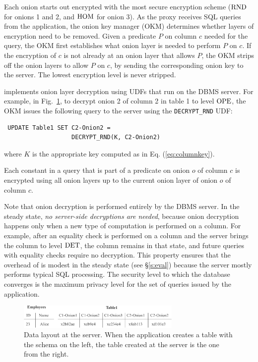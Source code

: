 Each onion starts out encrypted with the most secure encryption scheme
($\textrm{RND}$ for onions 1 and 2, and $\textrm{HOM}$ for onion 3)\@.  As the proxy
receives SQL queries from the application, the onion key manager (OKM)
determines whether layers of encryption need to be removed.  Given a
predicate $P$ on column $c$ needed for the query, the OKM first
establishes what onion layer is needed to perform $P$ on $c$.  If the
encryption of $c$ is not already at an onion layer that allows $P$,
the OKM strips off the onion layers to allow $P$ on $c$, by sending
the corresponding onion key to the server. The lowest encryption level is never stripped.

\name{} implements onion layer decryption using UDFs that run on the
DBMS server.  For example, in Fig.~\ref{fig:schema}, to decrypt onion 2 of column 2 in table 1 
to level $\textrm{OPE}$, the OKM issues the following query to the server
using the {\tt DECRYPT\_RND} UDF:

\begin{verbatim}
 UPDATE Table1 SET C2-Onion2 =
                   DECRYPT_RND(K, C2-Onion2)
\end{verbatim}
where $K$ is the appropriate key computed as in Eq.
(\ref{eq:columnkey}).

Each constant in a query that is part of a predicate on onion $o$ of column $c$ is encrypted using all onion layers up to the current onion layer of onion $o$ of column $c$. 

Note that onion decryption is performed entirely by the DBMS server.
In the steady state, {\em no server-side decryptions are needed},
because onion decryption happens only when a new type of computation
is performed on a column.  For example, after an equality check is performed
on a column and the server brings the column to level $\textrm{DET}$, the
column remains in that state, and future queries with equality checks require no decryption.  This property ensures that the
overhead of \name{} is modest in the steady state (see \S\ref{s:eval}) because the server mostly performs typical SQL processing.
The security level to which the database converges is the maximum
privacy level for the set of queries issued by the application.

\begin{figure}[t!] 
\centering
\includegraphics[width=3.1in]{fig/schema.pdf}
\caption{Data layout at the server. When the application creates a
  table with the schema on the left, the table created at the server
  is the one from the right.}
\label{fig:schema}
\end{figure}


